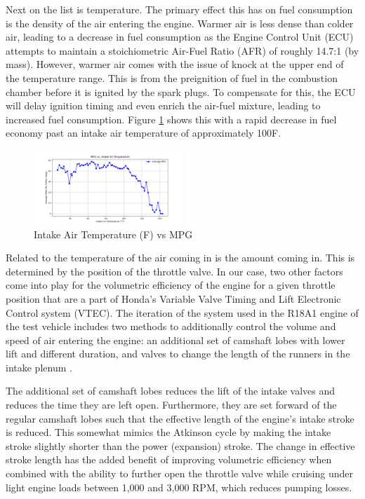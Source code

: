 \documentclass[letterpaper]{article}
\begin{document}
Next on the list is temperature. The primary effect this has on fuel 
consumption is the density of the air entering the engine. Warmer air is 
less dense than colder air, leading to a decrease in fuel consumption as 
the Engine Control Unit (ECU) attempts to maintain a stoichiometric 
Air-Fuel Ratio (AFR) of roughly 14.7:1 (by mass). However, warmer air 
comes with the issue of knock at the upper end of the temperature range. 
This is from the preignition of fuel in the combustion chamber before it 
is ignited by the spark plugs. To compensate for this, the ECU will delay 
ignition timing and even enrich the air-fuel mixture, leading to increased 
fuel consumption. Figure \ref{fig:intakeairtempmpg} shows this with a rapid 
decrease in fuel  economy past an intake air temperature of approximately 
100\textdegree F.

\begin{figure}[htbp]
    \centering
    \includegraphics[width=0.5\textwidth]{figures/intake_air_temp_mpg.png}
    \caption{Intake Air Temperature (\textdegree F) vs MPG}
    \label{fig:intakeairtempmpg}
\end{figure}

Related to the temperature of the air coming in is the amount coming in. 
This is determined by the position of the throttle valve. In our case, two 
other factors come into play for the volumetric efficiency of the engine 
for a given throttle position that are a part of Honda's Variable Valve 
Timing and Lift Electronic Control system (VTEC). The iteration of the 
system used in the R18A1 engine of the test vehicle includes two methods 
to additionally control the volume and speed of air entering the engine: 
an additional set of camshaft lobes with lower lift and different 
duration, and valves to change the length of the runners in the intake 
plenum \cite{Bandgar2024}. 

The additional set of camshaft lobes reduces the lift of the intake valves 
and reduces the time they are left open. Furthermore, they are set forward 
of the regular camshaft lobes such that the effective length of the 
engine's intake stroke is reduced. This somewhat mimics the Atkinson cycle 
by making the intake stroke slightly shorter than the power (expansion) 
stroke. The change in effective stroke length has the added benefit of 
improving volumetric efficiency when combined with the ability to further 
open the throttle valve while cruising under light engine loads between 
1,000 and 3,000 RPM, which reduces pumping losses.
\end{document}
